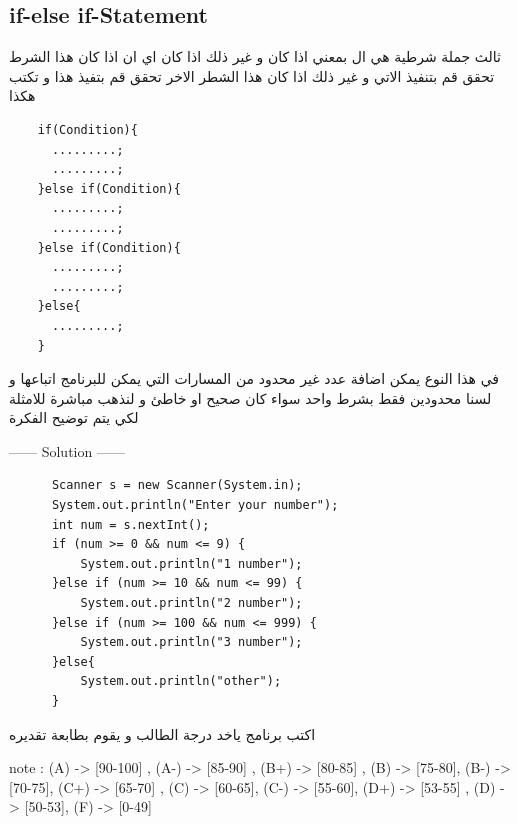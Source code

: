   \subsection{if-else if-Statement}
  \begin{minipage}[h]{1\textwidth}
  \begin{AR}
    ثالث جملة شرطية هي ال  بمعني اذا كان و غير ذلك اذا كان اي ان اذا كان هذا الشرط تحقق قم بتنفيذ الاتي و غير ذلك اذا كان هذا الشطر الاخر تحقق قم بتفيذ هذا و تكتب هكذا
  \end{AR}
  
  \begin{verbatim}
    if(Condition){
      .........;
      .........;
    }else if(Condition){
      .........;
      .........;
    }else if(Condition){
      .........;
      .........;
    }else{
      .........;
    }
  \end{verbatim}
  \end{minipage} 
  \begin{AR}
    في هذا النوع يمكن اضافة عدد غير محدود من المسارات التي يمكن للبرنامج اتباعها 
    و لسنا محدودين فقط بشرط واحد سواء كان صحيح او خاطئ و لنذهب مباشرة للامثلة لكي يتم توضيح الفكرة
  \end{AR}
  \begin{example}
    
    \begin{center}
      ------ \textcolor{Solution}{Solution} ------ 
    \end{center} 

    \begin{verbatim}
      Scanner s = new Scanner(System.in);
      System.out.println("Enter your number");
      int num = s.nextInt();
      if (num >= 0 && num <= 9) {
          System.out.println("1 number");
      }else if (num >= 10 && num <= 99) {
          System.out.println("2 number");
      }else if (num >= 100 && num <= 999) {
          System.out.println("3 number");
      }else{
          System.out.println("other");
      }
    \end{verbatim}
  \end{example}

\begin{task}
    \begin{AR}
      اكتب برنامج ياخد درجة الطالب و يقوم بطابعة تقديره 
    \end{AR}

    note : (A) -> [90-100] , (A-) -> [85-90] , (B+) -> [80-85]
    , (B) -> [75-80], (B-) -> [70-75], (C+) -> [65-70]
    , (C) -> [60-65], (C-) -> [55-60], (D+) -> [53-55]
    , (D) -> [50-53], (F) -> [0-49]

\end{task}
  \newpage

